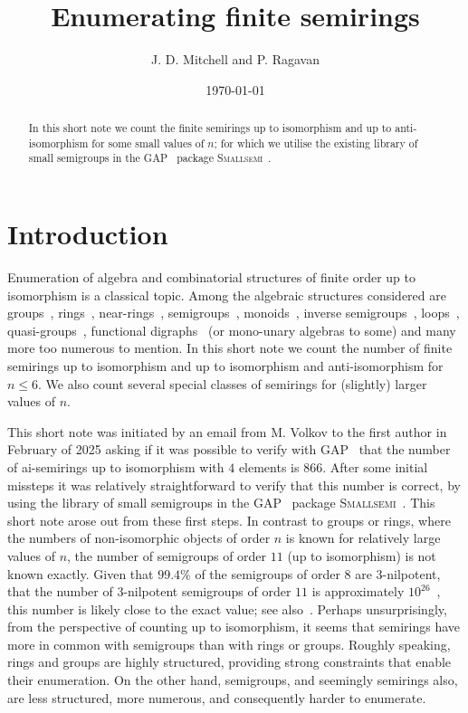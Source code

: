 \documentclass{article}
\title{Enumerating finite semirings}
\author{J. D. Mitchell and P. Ragavan}
\date{\today}
\theoremstyle{definition}
\theoremstyle{plain}
\newcommand{\GAP}{\textsc{GAP}~\cite{GAP4}\xspace}
\newcommand{\Smallsemi}{\textsc{Smallsemi}~\cite{Smallsemi}\xspace}
\begin{document}
\maketitle

\begin{abstract}
  In this short note we count the finite semirings up to isomorphism
  and up to anti-isomorphism for some small values of $n$; for which we
  utilise the existing library of small semigroups in the \GAP
  package \Smallsemi.
\end{abstract}

\section{Introduction}


Enumeration of algebra and combinatorial structures of finite order up to
isomorphism is a classical topic. Among the algebraic structures considered are
groups~\cite{BESCHE2002,}, rings~\cite{Blackburn2022, Fine1993, Kruse1970,
A027623}, near-rings~\cite{SONATA, A305858}, semigroups~\cite{A027851},
monoids~\cite{A058129}, inverse semigroups~\cite{A001428},
loops~\cite{A000315}, quasi-groups~\cite{A002860}, functional
digraphs~\cite{A001373} (or mono-unary algebras to some) and many more too
numerous to mention. In this short note we count the number of finite semirings
up to isomorphism and up to isomorphism and anti-isomorphism for $n \leq 6$. We
also count several special classes of semirings for (slightly) larger values of
$n$.

This short note was initiated by an email from M. Volkov to the first author in
February of 2025 asking if it was possible to verify with \GAP that the number
of ai-semirings up to isomorphism with $4$ elements is $866$.
After some initial missteps it was relatively straightforward to verify that
this number is correct, by using the library of small semigroups in the \GAP
package \Smallsemi. This short note arose out from these first steps. In
contrast to groups or rings, where the numbers of non-isomorphic objects of
order $n$ is known for relatively large values of $n$, the number of semigroups
of order $11$ (up to isomorphism) is not known exactly. Given that $99.4\%$ of
the semigroups of order $8$ are $3$-nilpotent, that the number of $3$-nilpotent
semigroups of order $11$ is approximately $10 ^ {26}$~\cite{}, this number is
likely close to the exact value; see also~\cite{}. Perhaps unsurprisingly, from
the perspective of counting up to isomorphism, it seems that semirings have
more in common with semigroups than with rings or groups. Roughly speaking,
rings and groups are highly structured, providing strong constraints that
enable their enumeration. On the other hand, semigroups, and seemingly
semirings also, are less structured, more numerous, and consequently harder to
enumerate.
\end{document}
